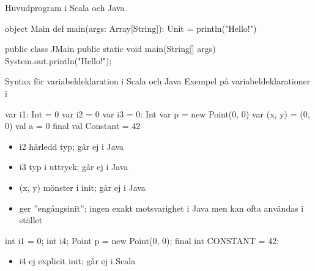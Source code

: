 \begin{Slide}{Huvudprogram i Scala och Java}
\begin{multicols}{2}
\begin{CodeSmall}[basicstyle=\ttfamily\SlideFontSize{6}{8}]
object Main {
  def main(args: Array[String]): Unit = {
    println("Hello!")
  }
}
\end{CodeSmall}

\columnbreak

\begin{CodeSmall}[language=Java,basicstyle=\ttfamily\SlideFontSize{6}{8}]
public class JMain {
  public static void main(String[] args){
    System.out.println("Hello!");
  }
}
\end{CodeSmall}
\end{multicols}
\end{Slide}



\begin{Slide}{Syntax för variabeldeklaration i Scala och Java}\SlideFontSmall
Exempel på variabeldeklarationer i
\begin{multicols}{2}
\begin{CodeSmall}[basicstyle=\ttfamily\SlideFontSize{8}{10}]
  var i1: Int = 0
  var i2 = 0
  var i3 = 0: Int
  var p = new Point(0, 0)
  var (x, y) = (0, 0)        
  val a = 0
  final val Constant = 42
\end{CodeSmall}
\begin{itemize}\SlideFontTiny
\item i2 härledd typ; går ej i Java

\item i3 typ i uttryck; går ej i Java

\item (x, y) mönster i init; går ej i Java

\item {} ger ''engångsinit''; ingen exakt motsvarighet i Java men  kan ofta användas i stället
\end{itemize}

\columnbreak

\begin{CodeSmall}[language=Java,basicstyle=\ttfamily\SlideFontSize{8}{10}]
  int i1 = 0;
  int i4;
  Point p = new Point(0, 0);
  final int CONSTANT = 42;
\end{CodeSmall}
\begin{itemize}\SlideFontTiny
\item i4 ej explicit init; går ej i Scala
\end{itemize}
\end{multicols}

\end{Slide}


